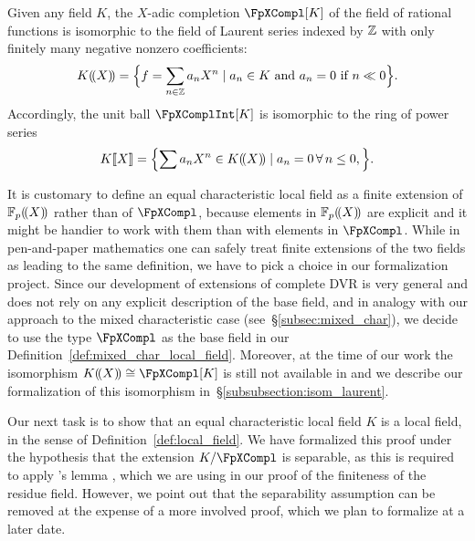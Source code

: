 \documentclass[sigplan,10pt,anonymous,review]{acmart}
\begin{document}
\begin{remark}\label{rmk:laurent_vs_adic}
Given any field $K$, the $X$-adic completion $\FpXCompl[K]$ of the field of rational functions is isomorphic to the field of Laurent series indexed by $\ZZ$ with only finitely many negative nonzero coefficients:
\[
\laurentseries[K]=\Bigl\{f=\sum_{n \in\ZZ}a_nX^n \mid a_n \in K\text{ and }a_n = 0 \text{ if }n\ll 0\Bigr\}.
\]
Accordingly, the unit ball $\FpXComplInt[K]$ is isomorphic to the ring of power series
\[
\powerseries[K]=\Bigl\{\sum a_nX^n \in \laurentseries[K]\mid a_n=0 \,\forall\,n\le 0, \Bigr\}.
\]

It is customary to define an equal characteristic local field as a finite extension of $\laurentseries$ rather than of $\FpXCompl$, because elements in $\laurentseries$ are explicit and it might be handier to work with them than with elements in $\FpXCompl$. While in pen-and-paper mathematics one can safely treat finite extensions of the two fields as leading to the same definition, we have to pick a choice in our formalization project. Since our development of extensions of complete DVR is very general and does not rely on any explicit description of the base field, and in analogy with our approach to the mixed characteristic case (see~\S\ref{subsec:mixed_char}), we decide to use the type $\FpXCompl$ as the base field in our Definition~\ref{def:mixed_char_local_field}. Moreover, at the time of our work the isomorphism $\laurentseries[K]\cong \FpXCompl[K]$ is still not available in \mathlib and we describe our formalization of this isomorphism in~\S\ref{subsubsection:isom_laurent}.
\end{remark}

Our next task is to show that an equal characteristic local field $K$ is a local field, in the sense of Definition~\ref{def:local_field}. We have formalized this proof under the hypothesis that the extension $K/\FpXCompl$ is separable, as this is required to apply \mathlib's lemma \href{https://leanprover-community.github.io/mathlib_docs/ring_theory/dedekind_domain/integral_closure.html#is_integral_closure.is_noetherian}{\extlink}, which we are using in our proof of the finiteness of the residue field. However, we point out that the separability assumption can be removed at the expense of a more involved proof, which we plan to formalize at a later date.
\end{document}
